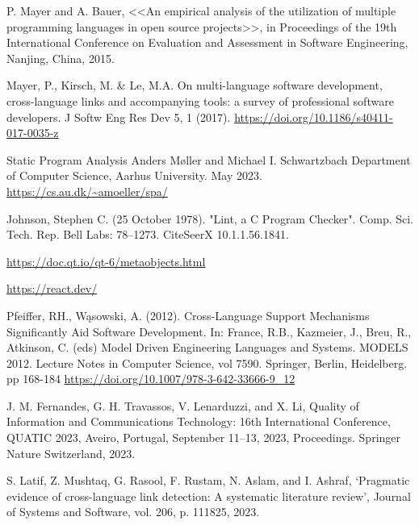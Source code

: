 \begingroup
\renewcommand{\section}[2]{\anonsection{Библиографический список}}
\begin{thebibliography}{00}

    P. Mayer and A. Bauer, 
    <<An empirical analysis of the utilization of multiple programming languages in open source projects>>, 
    in Proceedings of the 19th International Conference on Evaluation and Assessment in Software Engineering, 
    Nanjing, China, 2015.

    Mayer, P., Kirsch, M. \& Le, M.A. On multi-language software development,
    cross-language links and accompanying tools: 
    a survey of professional software developers. 
    J Softw Eng Res Dev 5, 1 (2017). \url{https://doi.org/10.1186/s40411-017-0035-z}


    Static Program Analysis
    Anders Møller and Michael I. Schwartzbach
    Department of Computer Science, Aarhus University. May 2023.
    \url{https://cs.au.dk/~amoeller/spa/}

    Johnson, Stephen C. (25 October 1978).
    "Lint, a C Program Checker". 
    Comp. Sci. Tech. Rep. Bell Labs: 78–1273.
    CiteSeerX 10.1.1.56.1841. 

    \url{https://doc.qt.io/qt-6/metaobjects.html}

    \url{https://react.dev/}

    Pfeiffer, RH., Wąsowski, A. (2012).
    Cross-Language Support Mechanisms Significantly Aid Software Development.
    In: France, R.B., Kazmeier, J., Breu, R., Atkinson, C. (eds)
    Model Driven Engineering Languages and Systems. MODELS 2012. 
    Lecture Notes in Computer Science, vol 7590. Springer, Berlin, Heidelberg.
    pp 168-184
    \url{https://doi.org/10.1007/978-3-642-33666-9_12}

    J. M. Fernandes, G. H. Travassos, V. Lenarduzzi, and X. Li, 
    Quality of Information and Communications Technology: 
    16th International Conference, QUATIC 2023,
    Aveiro, Portugal, September 11--13, 2023,
    Proceedings. Springer Nature Switzerland, 2023.


    S. Latif, Z. Mushtaq, G. Rasool, F. Rustam, N. Aslam,
    and I. Ashraf, ‘Pragmatic evidence of cross-language link detection:
    A systematic literature review’, Journal of Systems and Software,
    vol. 206, p. 111825, 2023.

\end{thebibliography}
\endgroup

\clearpage
